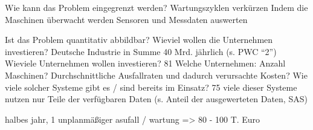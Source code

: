 Wie kann das Problem eingegrenzt werden?
Wartungszyklen verkürzen
Indem die Maschinen überwacht werden
Sensoren und Messdaten auswerten

Ist das Problem quantitativ abbildbar?
Wieviel wollen die Unternehmen investieren?
Deutsche Industrie in Summe 40 Mrd. jährlich (s. PWC “2”)
Wieviele Unternehmen wollen investieren?
81%
Welche Unternehmen: Anzahl Maschinen?
Durchschnittliche Ausfallraten und dadurch verursachte Kosten?
Wie viele solcher Systeme gibt es / sind bereits im Einsatz?
75%
viele dieser Systeme nutzen nur Teile der verfügbaren Daten (s. Anteil der ausgewerteten Daten, SAS) 

halbes jahr, 1 unplanmäßiger asufall / wartung => 80 - 100 T. Euro

